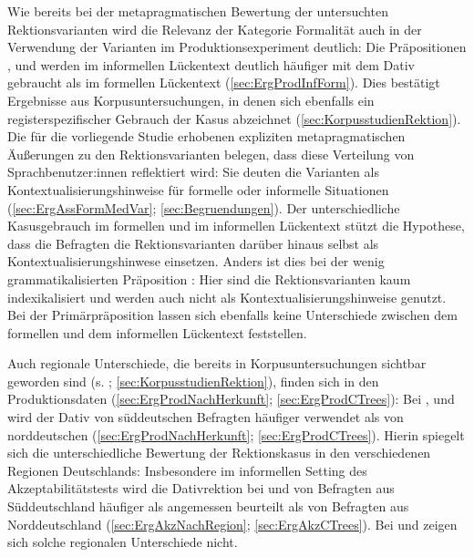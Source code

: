 Wie bereits bei der metapragmatischen Bewertung der untersuchten Rektionsvarianten wird die Relevanz der Kategorie \glqq Formalität\grqq{} auch in der Verwendung der Varianten im Produktionsexperiment deutlich: 
Die Präpositionen \wegen{}, \waehrend{} und \dank{} werden im informellen Lückentext deutlich häufiger mit dem Dativ gebraucht als im formellen Lückentext (\autoref{sec:ErgProdInfForm}).
Dies bestätigt Ergebnisse aus Korpusuntersuchungen, in denen sich ebenfalls ein registerspezifischer Gebrauch der Kasus abzeichnet (\autoref{sec:KorpusstudienRektion}).
Die für die vorliegende Studie erhobenen expliziten metapragmatischen Äußerungen zu den Rektionsvarianten belegen, dass diese Verteilung von Sprachbenutzer:innen reflektiert wird: 
Sie deuten die Varianten als Kontextualisierungshinweise für formelle oder informelle Situationen (\autoref{sec:ErgAssFormMedVar}; \autoref{sec:Begruendungen}).  
Der unterschiedliche Kasusgebrauch im formellen und im informellen Lückentext stützt die Hypothese, dass die Befragten die Rektionsvarianten darüber hinaus selbst als Kontextualisierungshinwese einsetzen. 
Anders ist dies bei der wenig grammatikalisierten Präposition \gegenueber{}:
Hier sind die Rektionsvarianten kaum indexikalisiert und werden auch nicht als Kontextualisierungshinweise genutzt. 
Bei der Primärpräposition  lassen sich ebenfalls keine Unterschiede zwischen dem formellen und dem informellen Lückentext feststellen. 
 
Auch regionale Unterschiede, die bereits in Korpusuntersuchungen sichtbar geworden sind (s. \cites{Petig1997}{Elter2005}; \autoref{sec:KorpusstudienRektion}), finden sich in den Produktionsdaten (\autoref{sec:ErgProdNachHerkunft}; \autoref{sec:ErgProdCTrees}): 
Bei \wegen{}, \waehrend{} und \dank{} wird der Dativ von süddeutschen Befragten häufiger verwendet als von norddeutschen (\autoref{sec:ErgProdNachHerkunft}; \autoref{sec:ErgProdCTrees}). 
Hierin spiegelt sich die unterschiedliche Bewertung der Rektionskasus in den verschiedenen Regionen Deutschlands:
Insbesondere im informellen Setting des Akzeptabilitätstests wird die Dativrektion bei \wegen{} und \waehrend{} von Befragten aus Süddeutschland häufiger als angemessen beurteilt als von Befragten aus Norddeutschland (\autoref{sec:ErgAkzNachRegion}; \autoref{sec:ErgAkzCTrees}). 
Bei \gegenueber{} und  zeigen sich solche regionalen Unterschiede nicht. 


